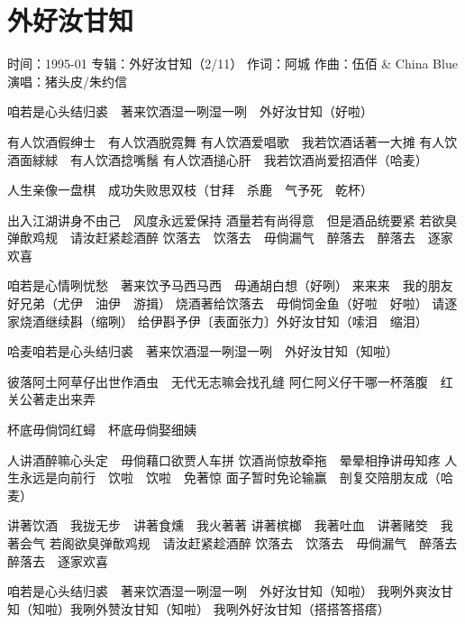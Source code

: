 \documentclass[UTF8,a4paper,oneside,twocolumn,12pt]{ctexbook}
\newcommand{\infopair}[2]{\textbullet #1：#2}
\newcommand{\zc}[1][伍佰]{\infopair{作词}{#1}}
\newcommand{\zq}[1][伍佰]{\infopair{作曲}{#1}}
\newcommand{\zj}[1]{\infopair{专辑}{#1}}
\newcommand{\sj}[1]{\infopair{时间}{#1}}
\newenvironment{info}{\begin{flushleft}\kaishu
	}
	{\end{flushleft}\normalsize\yahei\par}
\newenvironment{lyric}{
	}
{}
\begin{document}
\section{外好汝甘知}
\begin{info}
	\sj{1995-01}
	\zj{外好汝甘知（2/11）}
	\zc[阿城]
	\zq[伍佰 \& China Blue]
	\infopair{演唱}{猪头皮/朱约信}
\end{info}
\begin{lyric}
	咱若是心头结归裘　著来饮酒湿一咧湿一咧　外好汝甘知（好啦）

	有人饮酒假绅士　有人饮酒脱霓舞
	有人饮酒爱唱歌　我若饮酒话著一大摊
	有人饮酒面絿絿　有人饮酒捻嘴鬚
	有人饮酒搥心肝　我若饮酒尚爱招酒伴（哈麦）

	人生亲像一盘棋　成功失败思双枝（甘拜　杀鹿　气予死　乾杯）

	出入江湖讲身不由己　风度永远爱保持
	酒量若有尚得意　但是酒品统要紧
	若欲臭弹歕鸡规　请汝赶紧趁酒醉
	饮落去　饮落去　毋倘漏气　醉落去　醉落去　逐家欢喜

	咱若是心情咧忧愁　著来饮予马西马西　毋通胡白想（好咧）
	来来来　我的朋友好兄弟（尤伊　油伊　游揖）
	烧酒著给饮落去　毋倘饲金鱼（好啦　好啦）
	请逐家烧酒继续斟（缩咧）
	给伊斟予伊〔表面张力〕外好汝甘知（嗦泪　缩泪）

	哈麦咱若是心头结归裘　著来饮酒湿一咧湿一咧　外好汝甘知（知啦）

	彼落阿土阿草仔出世作酒虫　无代无志嘛会找孔缝
	阿仁阿义仔干哪一杯落腹　红关公著走出来弄

	杯底毋倘饲红蟳　杯底毋倘娶细姨

	人讲酒醉嘛心头定　毋倘藉口欲贾人车拼
	饮酒尚惊敖牵拖　晕晕相挣讲毋知疼
	人生永远是向前行　饮啦　饮啦　免著惊
	面子暂时免论输赢　剖复交陪朋友成（哈麦）

	讲著饮酒　我拢无步　讲著食燻　我火著著
	讲著槟榔　我著吐血　讲著赌筊　我著会气
	若阁欲臭弹歕鸡规　请汝赶紧趁酒醉
	饮落去　饮落去　毋倘漏气　醉落去　醉落去　逐家欢喜

	咱若是心头结归裘　著来饮酒湿一咧湿一咧　外好汝甘知（知啦）
	我咧外爽汝甘知（知啦）我咧外赞汝甘知（知啦）
	我咧外好汝甘知（搭搭答搭瘩）
\end{lyric}
\end{document}
